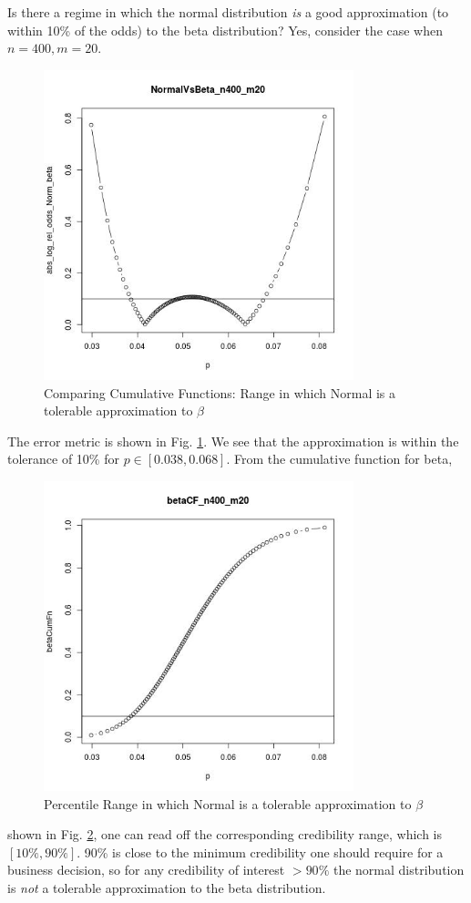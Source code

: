\documentclass[letterpaper,12pt]{article}
\begin{document}
Is there a regime in which the normal distribution {\em is} a good
approximation (to within 10\% of the odds) to the beta distribution? Yes,
consider the case when \(n=400, m=20\).
\begin{figure}[ht!]
\centering
\includegraphics[width=90mm]{NormalVsBeta_n400_m20}
\caption{Comparing Cumulative Functions: Range in which Normal is a
tolerable approximation to \(\beta\) \label{fig:NormalVsBeta_400_20}}
\end{figure}
The error metric is shown in Fig. \ref{fig:NormalVsBeta_400_20}.
We see that the approximation is within the tolerance of 10\% for
\(p\in[0.038,0.068]\). From the cumulative function for beta,
\begin{figure}[ht!]
\centering
\includegraphics[width=90mm]{betaCF_n400_m20}
\caption{Percentile Range in which Normal is a
tolerable approximation to \(\beta\)  \label{fig:betaCF_400_20}}
\end{figure}
shown in Fig. \ref{fig:betaCF_400_20},
one can read off the corresponding credibility range, which is \([10\%,90\%]\).
90\% is close to the minimum credibility one should require for a
business decision, so for any credibility of interest \(>90\%\) the
normal distribution is {\em not} a tolerable
approximation to the beta distribution.
\end{document}
